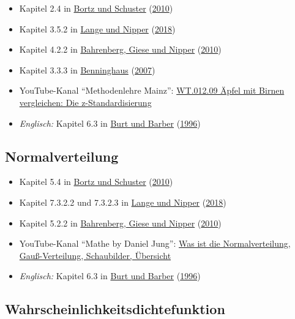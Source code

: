 \documentclass[
  11pt,
  ngerman,
  a4paper,
]{report}
\providecommand{\tightlist}{%
  \setlength{\itemsep}{0pt}\setlength{\parskip}{0pt}}
\begin{document}
\begin{itemize}
\tightlist
\item
  Kapitel 2.4 in \protect\hyperlink{ref-bortz}{Bortz und Schuster} (\protect\hyperlink{ref-bortz}{2010})
\item
  Kapitel 3.5.2 in \protect\hyperlink{ref-delange}{Lange und Nipper} (\protect\hyperlink{ref-delange}{2018})
\item
  Kapitel 4.2.2 in \protect\hyperlink{ref-bahrenberg}{Bahrenberg, Giese und Nipper} (\protect\hyperlink{ref-bahrenberg}{2010})
\item
  Kapitel 3.3.3 in \protect\hyperlink{ref-benninghaus}{Benninghaus} (\protect\hyperlink{ref-benninghaus}{2007})
\item
  YouTube-Kanal \enquote{Methodenlehre Mainz}: \href{https://www.youtube.com/watch?v=AiucvUlIP8k}{WT.012.09 Äpfel mit Birnen vergleichen: Die z-Standardisierung}
\item
  \emph{Englisch:} Kapitel 6.3 in \protect\hyperlink{ref-burt}{Burt und Barber} (\protect\hyperlink{ref-burt}{1996})
\end{itemize}

\hypertarget{normalverteilung-1}{%
\subsection{Normalverteilung}\label{normalverteilung-1}}

\begin{itemize}
\tightlist
\item
  Kapitel 5.4 in \protect\hyperlink{ref-bortz}{Bortz und Schuster} (\protect\hyperlink{ref-bortz}{2010})
\item
  Kapitel 7.3.2.2 und 7.3.2.3 in \protect\hyperlink{ref-delange}{Lange und Nipper} (\protect\hyperlink{ref-delange}{2018})
\item
  Kapitel 5.2.2 in \protect\hyperlink{ref-bahrenberg}{Bahrenberg, Giese und Nipper} (\protect\hyperlink{ref-bahrenberg}{2010})
\item
  YouTube-Kanal \enquote{Mathe by Daniel Jung}: \href{https://www.youtube.com/watch?v=_f1vgWUiavY}{Was ist die Normalverteilung, Gauß-Verteilung, Schaubilder, Übersicht}
\item
  \emph{Englisch:} Kapitel 6.3 in \protect\hyperlink{ref-burt}{Burt und Barber} (\protect\hyperlink{ref-burt}{1996})
\end{itemize}

\hypertarget{wahrscheinlichkeitsdichtefunktion}{%
\subsection{Wahrscheinlichkeitsdichtefunktion}\label{wahrscheinlichkeitsdichtefunktion}}
\end{document}
